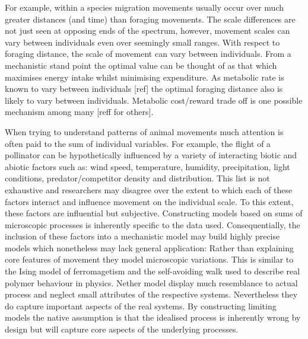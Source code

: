 \documentclass[11pt,usenames,dvipsnames]{article}
\begin{document}
For example, within a species migration movements usually occur over much greater distances (and time) than foraging movements. The scale differences are not just seen at opposing ends of the spectrum, however, movement scales can vary between individuals even over seemingly small ranges. With respect to foraging distance, the scale of movement can vary between individuals. From a mechanistic stand point the optimal value can be thought of as that which maximises energy intake whilst minimising expenditure. As metabolic rate is known to vary between individuals [ref] the optimal foraging distance also is likely to vary between individuals. Metabolic cost/reward trade off is one possible mechanism among many [reff for others].

When trying to understand patterns of animal movements much attention is often paid to the sum of individual variables. For example, the flight of a pollinator can be hypothetically influenced by a variety of interacting biotic and abiotic factors such as: wind speed, temperature, humidity, precipitation, light conditions, predator/competitor density and distribution. This list is not exhaustive and researchers may disagree over the extent to which each of these factors interact and influence movement on the individual scale. To this extent, these factors are influential but subjective. Constructing models based on sums of microscopic processes is inherently specific to the data used. Consequentially, the inclusion of these factors into a mechanistic model may build highly precise models which nonetheless may lack general application: Rather than explaining core features of movement they model microscopic variations. This is similar to the Ising model of ferromagetism and the self-avoiding walk used to describe real polymer behaviour in physics. Nether model display much resemblance to actual process and neglect small attributes of the respective systems. Nevertheless they do capture important aspects of the real systems. By constructing limiting models the native assumption is that the idealised process is inherently wrong by design but will capture core aspects of the underlying processes.  
\end{document}
